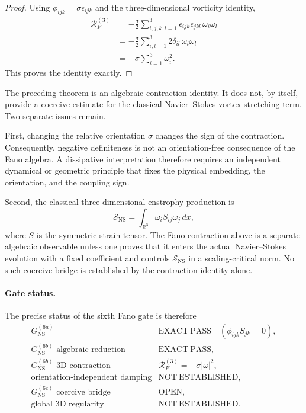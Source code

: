 \documentclass{article}
\begin{document}
\begin{proof}
Using $\phi_{ijk}=\sigma\epsilon_{ijk}$ and the three-dimensional vorticity
identity,
\begin{align}
\mathcal R_F^{(3)}
&=-\frac{\sigma}{2}
  \sum_{i,j,k,l=1}^{3}
  \epsilon_{ijk}\epsilon_{jkl}\,\omega_i\omega_l \\
&=-\frac{\sigma}{2}
  \sum_{i,l=1}^{3}2\delta_{il}\,\omega_i\omega_l \\
&=-\sigma\sum_{i=1}^{3}\omega_i^2.
\end{align}
This proves the identity exactly.
\end{proof}

The preceding theorem is an algebraic contraction identity.  It does not, by
itself, provide a coercive estimate for the classical Navier--Stokes vortex
stretching term.  Two separate issues remain.

First, changing the relative orientation $\sigma$ changes the sign of the
contraction.  Consequently, negative definiteness is not an orientation-free
consequence of the Fano algebra.  A dissipative interpretation therefore
requires an independent dynamical or geometric principle that fixes the
physical embedding, the orientation, and the coupling sign.

Second, the classical three-dimensional enstrophy production is
\begin{equation}
\mathcal S_{\mathrm{NS}}
=\int_{\mathbb R^3}\omega_i S_{ij}\omega_j\,dx,
\end{equation}
where $S$ is the symmetric strain tensor.  The Fano contraction above is a
separate algebraic observable unless one proves that it enters the actual
Navier--Stokes evolution with a fixed coefficient and controls
$\mathcal S_{\mathrm{NS}}$ in a scaling-critical norm.  No such coercive bridge
is established by the contraction identity alone.

\paragraph{Gate status.}
The precise status of the sixth Fano gate is therefore
\[
\boxed{
\begin{array}{ll}
G_{\mathrm{NS}}^{(6a)} & \mathrm{EXACT\ PASS}\quad
  (\phi_{ijk}S_{jk}=0),\\
G_{\mathrm{NS}}^{(6b)}\text{ algebraic reduction} & \mathrm{EXACT\ PASS},\\
G_{\mathrm{NS}}^{(6b)}\text{ 3D contraction} &
  \mathcal R_F^{(3)}=-\sigma|\omega|^2,\\
\text{orientation-independent damping} & \mathrm{NOT\ ESTABLISHED},\\
G_{\mathrm{NS}}^{(6c)}\text{ coercive bridge} & \mathrm{OPEN},\\
\text{global 3D regularity} & \mathrm{NOT\ ESTABLISHED}.
\end{array}}
\]
\end{document}
